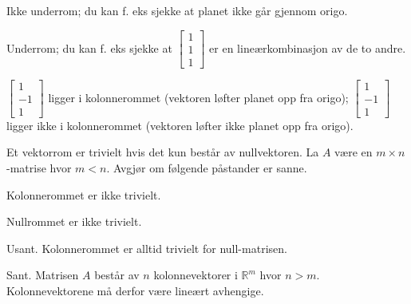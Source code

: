 \begin{losning}

\begin{punkt}
Ikke underrom; du kan f. eks sjekke at planet ikke går gjennom origo.
\end{punkt}

\begin{punkt}
Underrom; du kan f. eks sjekke at $\begin{bmatrix}
1\\
1\\
1
\end{bmatrix}$ er en lineærkombinasjon av de to andre.
\end{punkt}

\begin{punkt}
$\begin{bmatrix}
1\\
-1\\
1
\end{bmatrix}$ ligger i kolonnerommet (vektoren løfter planet opp fra origo); $\begin{bmatrix}
1\\
-1\\
1
\end{bmatrix}$ ligger ikke i kolonnerommet (vektoren løfter ikke planet opp fra origo). 
\end{punkt}

\end{losning}

\begin{oppgave}
Et vektorrom er trivielt hvis det kun består av nullvektoren. La $A$ være en $m\times n$-matrise hvor $m<n$. Avgjør om følgende påstander er sanne.
\begin{punkt}
Kolonnerommet er ikke trivielt.
\end{punkt}

\begin{punkt}
Nullrommet er ikke trivielt.
\end{punkt}

\end{oppgave}

\begin{losning}

\begin{punkt}
Usant. Kolonnerommet er alltid trivielt for null-matrisen.
\end{punkt}

\begin{punkt}
Sant. Matrisen $A$ består av $n$ kolonnevektorer i $\mathbb{R}^m$ hvor $n>m$. Kolonnevektorene må derfor være lineært avhengige.
\end{punkt}

\end{losning}


